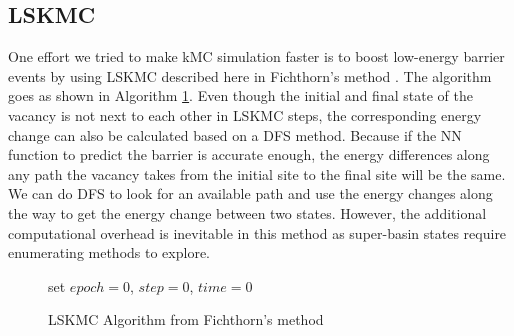 \subsection{\acf{LSKMC}}
\label{Chap:Al/Vac:sec:LSKMC}
One effort we tried to make \ac{kMC} simulation faster is to boost low-energy barrier events by using \acf{LSKMC} described here in Fichthorn's method \cite{fichthorn2013local}. The algorithm goes as shown in Algorithm \ref{algo:lskmc}. Even though the initial and final state of the vacancy is not next to each other in \ac{LSKMC} steps, the corresponding energy change can also be calculated based on a \ac{DFS} method. Because if the \ac{NN} function to predict the barrier is accurate enough, the energy differences along any path the vacancy takes from the initial site to the final site will be the same. We can do \ac{DFS} to look for an available path and use the energy changes along the way to get the energy change between two states. However, the additional computational overhead is inevitable in this method as super-basin states require enumerating methods to explore.

\begin{figure}[!htb]
  \centering
  \begin{minipage}{.75\linewidth}
    \begin{algorithm}[H]
      \caption{\acf{LSKMC} Algorithm from  Fichthorn's method \cite{fichthorn2013local}}\label{algo:lskmc}
      \begin{algorithmic}[1]
        \State set $epoch = 0$, $step = 0$, $time = 0$
        \Else
        \EndIf
        \EndIf

        \EndWhile
      \end{algorithmic}
    \end{algorithm}
  \end{minipage}
\end{figure}


